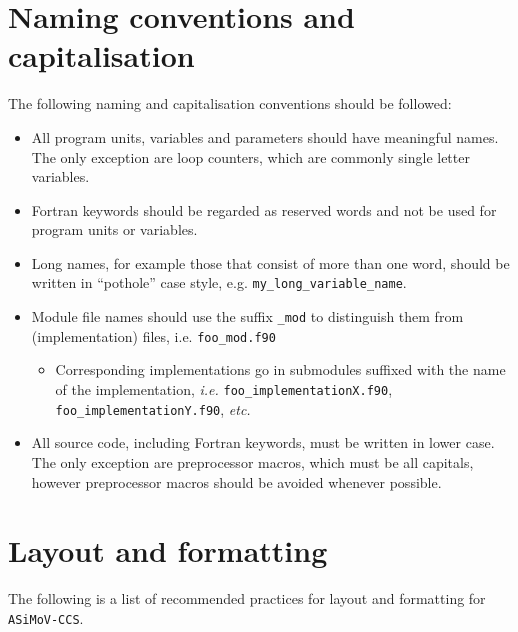 \documentclass[11pt]{report}
\newcommand{\accs}{\texttt{ASiMoV-CCS}}
\begin{document}
\section{Naming conventions and capitalisation}
The following naming and capitalisation conventions should be followed:
\begin{itemize}
  \item All program units, variables and parameters should have meaningful names. The only exception are loop counters, which
  are commonly single letter variables.
  \item Fortran keywords should be regarded as reserved words and not be used for program units or variables.
  \item Long names, for example those that consist of more than one word, 
  should be written in ``pothole'' case style, e.g. \texttt{my\_long\_variable\_name}.
  \item Module file names should use the suffix \texttt{\_mod} to distinguish them from
    (implementation) files, i.e. \texttt{foo\_mod.f90}
    \begin{itemize}
    \item Corresponding implementations go in submodules suffixed with the name of the
      implementation, \textit{i.e.}  \texttt{foo\_implementationX.f90},
      \texttt{foo\_implementationY.f90}, \textit{etc.}
    \end{itemize}
  \item All source code, including Fortran keywords, must be written in lower case. The only exception are preprocessor 
  macros, which must be all capitals, however preprocessor macros should be avoided whenever possible.
\end{itemize}

\section{Layout and formatting}
The following is a list of recommended practices for layout and formatting for \accs .
\end{document}
